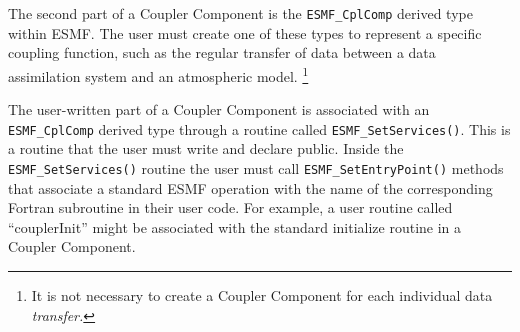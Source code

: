 The second part of a Coupler Component is the {\tt ESMF\_CplComp}
derived type within ESMF.  The user must create one of these types
to represent a specific coupling function, such as the regular
transfer of data between a data assimilation system and an 
atmospheric model.  \footnote{It is not necessary to create 
a Coupler Component for each individual data {\it transfer.}}

The user-written part of a Coupler Component is associated with an
{\tt ESMF\_CplComp} derived type through a routine called 
{\tt ESMF\_SetServices()}.
This is a routine that the user must write and declare public.
Inside the {\tt ESMF\_SetServices()} routine the user must call 
{\tt ESMF\_SetEntryPoint()} methods that associate a standard ESMF 
operation with the name of the corresponding Fortran subroutine in 
their user code.  For example, a user routine called ``couplerInit''
might be associated with the standard initialize routine in a 
Coupler Component.
